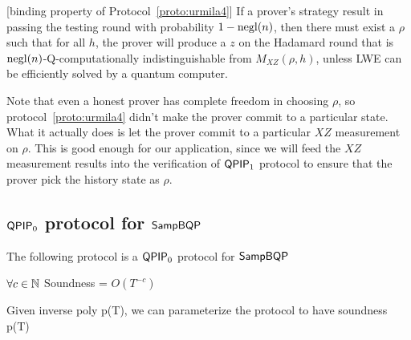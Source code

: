\begin{lemma}\label{lem:urmila-binding}[binding property of  Protocol~\ref{proto:urmila4}\cite{FOCS:Mahadev18a}]
If a prover's strategy result in passing the testing round with probability $1-\operatorname{negl}(n)$, then there must exist a $\rho$ such that for all $h$, the prover will produce a $z$ on the Hadamard round that is $\operatorname{negl}(n)$-Q-computationally indistinguishable from $M_{XZ}(\rho,h)$, unless LWE can be efficiently solved by a quantum computer. 
\end{lemma}

\begin{rmk}
Note that even a honest prover has complete freedom in choosing $\rho$, so protocol~\ref{proto:urmila4} didn't make the prover commit to a particular state. What it actually does is let the prover commit to a particular $XZ$ measurement on $\rho$. This is good enough for our application, since we will feed the $XZ$ measurement results into the verification of $\operatorname{\mathsf{QPIP}}_1$ protocol to ensure that the prover pick the history state as $\rho$.
\end{rmk}

\subsection{$\operatorname{\mathsf{QPIP}}_0$ protocol for $\operatorname{\mathsf{SampBQP}}$}

The following protocol is a $\operatorname{\mathsf{QPIP}}_0$ protocol for $\operatorname{\mathsf{SampBQP}}$

$\forall c\in\mathbb{N}$ Soundness = $O(T^{-c})$

Given inverse poly p(T), we can parameterize the protocol to have soundness p(T)




